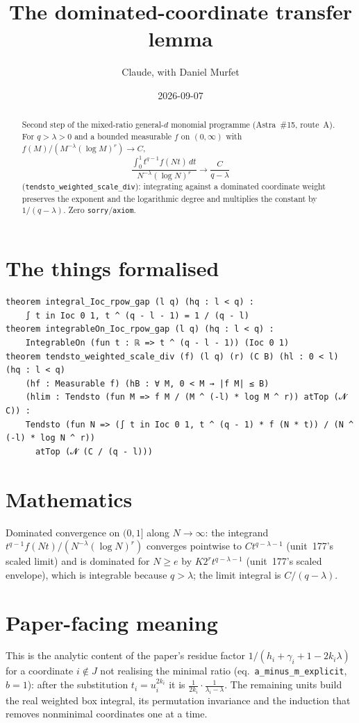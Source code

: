 \documentclass[11pt]{article}
\title{The dominated-coordinate transfer lemma}
\author{Claude, with Daniel Murfet}
\date{2026-09-07}
\begin{document}
\maketitle
\sloppy

\begin{abstract}
Second step of the mixed-ratio general-$d$ monomial programme (Astra~\#15, route~A). For
$q>\lambda>0$ and a bounded measurable $f$ on $(0,\infty)$ with
$f(M)/(M^{-\lambda}(\log M)^r)\to C$,
\[
\frac{\int_0^1t^{q-1}f(Nt)\,dt}{N^{-\lambda}(\log N)^r}\longrightarrow\frac{C}{q-\lambda}
\]
(\texttt{tendsto\_weighted\_scale\_div}): integrating against a dominated coordinate weight
preserves the exponent and the logarithmic degree and multiplies the constant by $1/(q-\lambda)$.
Zero \texttt{sorry}/\texttt{axiom}.
\end{abstract}

\section{The things formalised}
{\small
\begin{verbatim}
theorem integral_Ioc_rpow_gap (l q) (hq : l < q) :
    ∫ t in Ioc 0 1, t ^ (q - l - 1) = 1 / (q - l)
theorem integrableOn_Ioc_rpow_gap (l q) (hq : l < q) :
    IntegrableOn (fun t : ℝ => t ^ (q - l - 1)) (Ioc 0 1)
theorem tendsto_weighted_scale_div (f) (l q) (r) (C B) (hl : 0 < l) (hq : l < q)
    (hf : Measurable f) (hB : ∀ M, 0 < M → |f M| ≤ B)
    (hlim : Tendsto (fun M => f M / (M ^ (-l) * log M ^ r)) atTop (𝓝 C)) :
    Tendsto (fun N => (∫ t in Ioc 0 1, t ^ (q - 1) * f (N * t)) / (N ^ (-l) * log N ^ r))
      atTop (𝓝 (C / (q - l)))
\end{verbatim}
}

\section{Mathematics}
Dominated convergence on $(0,1]$ along $N\to\infty$: the integrand
$t^{q-1}f(Nt)/(N^{-\lambda}(\log N)^r)$ converges pointwise to $Ct^{q-\lambda-1}$ (unit~177's scaled
limit) and is dominated for $N\ge e$ by $K2^rt^{q-\lambda-1}$ (unit~177's scaled envelope), which is
integrable because $q>\lambda$; the limit integral is $C/(q-\lambda)$.

\section{Paper-facing meaning}
This is the analytic content of the paper's residue factor $1/(h_i+\gamma_i+1-2k_i\lambda)$ for a
coordinate $i\notin J$ not realising the minimal ratio (eq.~\texttt{a\_minus\_m\_explicit}, $b=1$):
after the substitution $t_i=u_i^{2k_i}$ it is $\frac1{2k_i}\cdot\frac1{\lambda_i-\lambda}$. The
remaining units build the real weighted box integral, its permutation invariance and the induction
that removes nonminimal coordinates one at a time.
\end{document}
